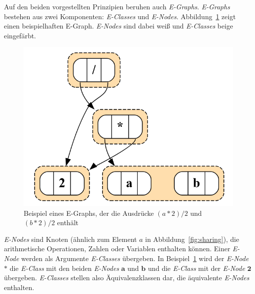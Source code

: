 Auf den beiden vorgestellten Prinzipien beruhen auch \textit{E-Graphs}. \textit{E-Graphs} bestehen aus zwei Komponenten: \textit{E-Classes} und \textit{E-Nodes}. 
Abbildung~\ref{fig:egraphexp} zeigt einen beispielhaften E-Graph. \textit{E-Nodes} sind dabei weiß und \textit{E-Classes} beige eingefärbt.

\begin{figure}[H]
  \centering
  \includegraphics[scale=0.5]{../fig/egraph_exp.png}
  \caption{Beispiel eines E-Graphs, der die Ausdrücke $(a * 2) / 2$ und $(b * 2) / 2$ enthält}
  \label{fig:egraphexp}
\end{figure}

\textit{E-Nodes} sind Knoten (ähnlich zum Element $a$ in Abbildung~\ref{fig:sharing}), die arithmetische Operationen, Zahlen oder Variablen enthalten können.
Einer \textit{E-Node} werden als Argumente \textit{E-Classes} übergeben. In Beispiel~\ref{fig:egraphexp} wird der \textit{E-Node} $\mathbf{*}$ die 
\textit{E-Class} mit den beiden \textit{E-Nodes} $\mathbf{a}$ und $\mathbf{b}$ und die \textit{E-Class} mit der \textit{E-Node} $\mathbf{2}$ übergeben. 
\textit{E-Classes} stellen also Äquivalenzklassen dar, die äquivalente \textit{E-Nodes} enthalten.


